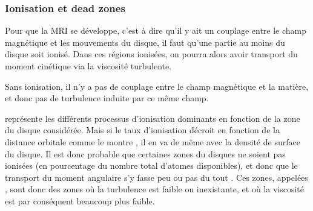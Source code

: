 \subsubsection{Ionisation et dead zones}\label{sec:ionisation_DZ}
Pour que la MRI se développe, c'est à dire qu'il y ait un couplage entre le champ magnétique et les mouvements du disque, il faut qu'une partie au moins du disque soit ionisé. Dans ces régions ionisées, on pourra alors avoir transport du moment cinétique via la viscosité turbulente. 

\bigskip

Sans ionisation, il n'y a pas de couplage entre le champ magnétique et la matière, et donc pas de turbulence induite par ce même champ. 

 représente les différents processus d'ionisation dominants en fonction de la zone du disque considérée.
Mais si le taux d'ionisation décroit en fonction de la distance orbitale \citep{ilgner2006ionisation1} comme le montre
, il en va de même avec la densité de surface du disque. Il est donc probable que certaines zones
du disques ne soient pas ionisées (en pourcentage du nombre total d'atomes disponibles), et donc que le transport du moment
angulaire s'y fasse peu ou pas du tout \citep{gammie1996layered}. Ces zones, appelées , sont donc des zones où
la turbulence est faible ou inexistante, et où la viscosité est par conséquent beaucoup plus faible. 

